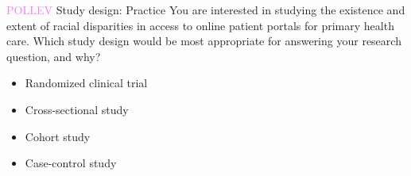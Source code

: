 \documentclass[10pt,t]{beamer}
\begin{document}
%
%
%



\begin{frame}{\textcolor{violet}{POLLEV} Study design: Practice}
	You are interested in studying the existence and extent of racial disparities in access to online patient portals for primary health care. Which study design would be most appropriate for answering your research question, and why?
	\bigskip
	
	\begin{itemize}
		\item Randomized clinical trial
		\item Cross-sectional study
		\item Cohort study
		\item Case-control study
	\end{itemize}
\end{frame}

%	
%	
\end{document}
